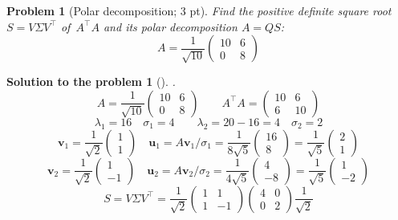 \documentclass[12pt,a4]{article}
\newtheorem{problem}{Problem}
\newtheorem{solution}{Solution to the problem}
\newcommand{\bu}{{\mathbf u}}
\newcommand{\bv}{{\mathbf v}}
\begin{document}
\begin{problem}[Polar decomposition; 3 pt]\label{prb:13.8}\rm
Find the positive definite square root $S = V\Sigma V^\top$ of~$A^\top A$ and its polar decomposition $A = QS$:
\[
   A = \frac1{\sqrt{10}} \begin{pmatrix}
     10 & 6 \\ 0 & 8
    \end{pmatrix}
\]
\end{problem}

\begin{solution}[] \rm .
\[
A = \frac1{\sqrt{10}}
\begin{pmatrix}
10 & 6 \\
0 & 8
\end{pmatrix}
\qquad A^\top A =
\begin{pmatrix}
10 & 6 \\
6 & 10
\end{pmatrix}
\]
\[
\lambda_1 = 16
\quad
\sigma_1 = 4
\qquad
\lambda_2 = 20 - 16 = 4
\quad
\sigma_2 = 2
\]
\[
\bv_1 = \frac1{\sqrt2}\begin{pmatrix} 1 \\ 1 \end{pmatrix}
\quad
\bu_1 = A \bv_1 / \sigma_1 = 
\frac1{8\sqrt{5}}
\begin{pmatrix} 16 \\ 8 \end{pmatrix} = 
\frac1{\sqrt{5}}
\begin{pmatrix} 2 \\ 1  \end{pmatrix}
\]
\[
\bv_2 = \frac1{\sqrt2}\begin{pmatrix} 1 \\ -1 \end{pmatrix}
\quad
\bu_2 = A \bv_2 / \sigma_2 = \frac1{4\sqrt{5}}
\begin{pmatrix} 4 \\ - 8 \end{pmatrix} = \frac1{\sqrt{5}}
\begin{pmatrix} 1 \\ - 2 \end{pmatrix}
\]
\[
S = V\Sigma V^\top
=
\frac1{\sqrt2}
\begin{pmatrix}
1 & 1 \\
1 & -1
\end{pmatrix}
\begin{pmatrix}
4 & 0 \\
0 & 2
\end{pmatrix}
\frac1{\sqrt2}
\]
\end{solution}
\end{document}
